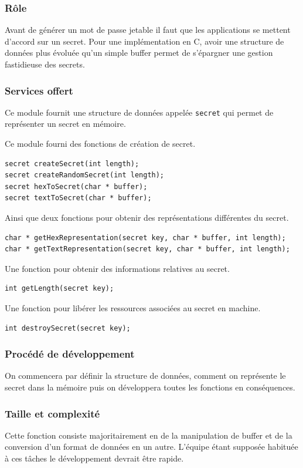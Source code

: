 \documentclass{"../../res/univ-projet"}
\begin{document}
\subsubsection{Rôle}
Avant de générer un mot de passe jetable il faut que les applications se mettent
d'accord sur un secret. Pour une implémentation en C, avoir une structure de données
plus évoluée qu'un simple buffer permet de s'épargner une gestion fastidieuse des secrets.

\subsubsection{Services offert}
Ce module fournit une structure de données appelée \verb?secret? qui permet de représenter
un secret en mémoire.

Ce module fourni des fonctions de création de secret.
\begin{lstlisting}
secret createSecret(int length);
secret createRandomSecret(int length);
secret hexToSecret(char * buffer);
secret textToSecret(char * buffer);
\end{lstlisting}
Ainsi que deux fonctions pour obtenir des représentations différentes du secret.
\begin{lstlisting}
char * getHexRepresentation(secret key, char * buffer, int length);
char * getTextRepresentation(secret key, char * buffer, int length);
\end{lstlisting}
Une fonction pour obtenir des informations relatives au secret.
\begin{lstlisting}
int getLength(secret key);
\end{lstlisting}
Une fonction pour libérer les ressources associées au secret en machine.
\begin{lstlisting}
int destroySecret(secret key);
\end{lstlisting}

\subsubsection{Procédé de développement}
On commencera par définir la structure de données, comment on représente le secret dans la mémoire
puis on développera toutes les fonctions en conséquences.

\subsubsection{Taille et complexité}
Cette fonction consiste majoritairement en de la manipulation de buffer et de la conversion d'un
format de données en un autre. L'équipe étant supposée habituée à ces tâches le développement devrait être 
rapide.
\end{document}
